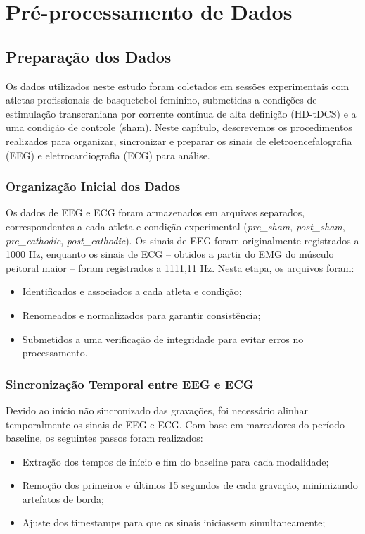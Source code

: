 \chapter{Pré-processamento de Dados}
\label{chap:preprocessamento_de_dados}

\section{Preparação dos Dados}

Os dados utilizados neste estudo foram coletados em sessões experimentais com atletas profissionais de basquetebol feminino, submetidas a condições de estimulação transcraniana por corrente contínua de alta definição (HD-tDCS) e a uma condição de controle (sham). Neste capítulo, descrevemos os procedimentos realizados para organizar, sincronizar e preparar os sinais de eletroencefalografia (EEG) e eletrocardiografia (ECG) para análise.

\subsection{Organização Inicial dos Dados}

Os dados de EEG e ECG foram armazenados em arquivos separados, correspondentes a cada atleta e condição experimental (\textit{pre\_sham}, \textit{post\_sham}, \textit{pre\_cathodic}, \textit{post\_cathodic}). Os sinais de EEG foram originalmente registrados a 1000 Hz, enquanto os sinais de ECG – obtidos a partir do EMG do músculo peitoral maior – foram registrados a 1111,11 Hz. Nesta etapa, os arquivos foram:
\begin{itemize}
    \item Identificados e associados a cada atleta e condição;
    \item Renomeados e normalizados para garantir consistência;
    \item Submetidos a uma verificação de integridade para evitar erros no processamento.
\end{itemize}

\subsection{Sincronização Temporal entre EEG e ECG}

Devido ao início não sincronizado das gravações, foi necessário alinhar temporalmente os sinais de EEG e ECG. Com base em marcadores do período baseline, os seguintes passos foram realizados:
\begin{itemize}
    \item Extração dos tempos de início e fim do baseline para cada modalidade;
    \item Remoção dos primeiros e últimos 15 segundos de cada gravação, minimizando artefatos de borda;
    \item Ajuste dos timestamps para que os sinais iniciassem simultaneamente;
\end{itemize}

